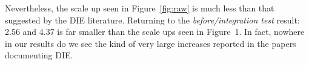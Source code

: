 \documentclass[smallcondesed]{svjour3}
\newcommand{\bi}{\begin{itemize}}%
\newcommand{\ei}{\end{itemize}}
\newcommand{\fig}[1]{Figure~\ref{fig:#1}}
\begin{document}
Nevertheless, the scale up seen in 
Figure~\ref{fig:raw} 
is much less
than that suggested by the DIE literature. Returning to
the {\em before/integration test} result: 2.56 and 4.37 is far smaller
than the scale ups seen in Figure~1. In fact, nowhere in 
our results do we see the kind of very large increases reported in the papers
documenting DIE.


 


 
 
\end{document}
